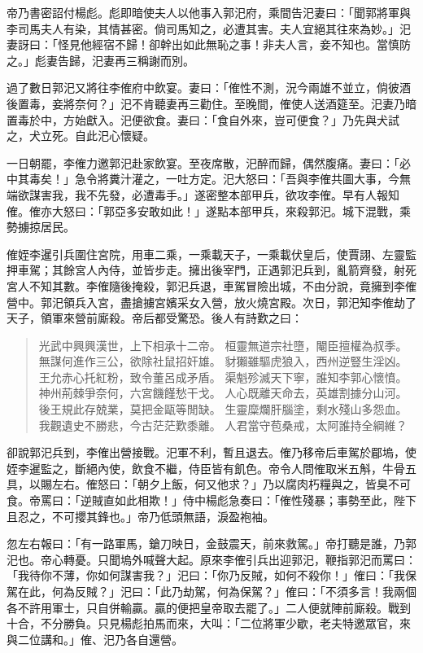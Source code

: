 帝乃書密詔付楊彪。彪即暗使夫人以他事入郭汜府，乘間告汜妻曰：「聞郭將軍與李司馬夫人有染，其情甚密。倘司馬知之，必遭其害。夫人宜絕其往來為妙。」汜妻訝曰：「怪見他經宿不歸！卻幹出如此無恥之事！非夫人言，妾不知也。當慎防之。」彪妻告歸，汜妻再三稱謝而別。

過了數日郭汜又將往李傕府中飲宴。妻曰：「傕性不測，況今兩雄不並立，倘彼酒後置毒，妾將奈何？」汜不肯聽妻再三勸住。至晚間，傕使人送酒筵至。汜妻乃暗置毒於中，方始獻入。汜便欲食。妻曰：「食自外來，豈可便食？」乃先與犬試之，犬立死。自此汜心懷疑。

一日朝罷，李傕力邀郭汜赴家飲宴。至夜席散，汜醉而歸，偶然腹痛。妻曰：「必中其毒矣！」急令將糞汁灌之，一吐方定。汜大怒曰：「吾與李傕共圖大事，今無端欲謀害我，我不先發，必遭毒手。」遂密整本部甲兵，欲攻李傕。早有人報知傕。傕亦大怒曰：「郭亞多安敢如此！」遂點本部甲兵，來殺郭汜。城下混戰，乘勢擄掠居民。

傕姪李暹引兵圍住宮院，用車二乘，一乘載天子，一乘載伏皇后，使賈詡、左靈監押車駕；其餘宮人內侍，並皆步走。擁出後宰門，正遇郭汜兵到，亂箭齊發，射死宮人不知其數。李傕隨後掩殺，郭汜兵退，車駕冒險出城，不由分說，竟擁到李傕營中。郭汜領兵入宮，盡搶擄宮嬪采女入營，放火燒宮殿。次日，郭汜知李傕劫了天子，領軍來營前廝殺。帝后都受驚恐。後人有詩歎之曰：

\begin{quote}
光武中興興漢世，上下相承十二帝。
桓靈無道宗社墮，閹臣擅權為叔季。
無謀何進作三公，欲除社鼠招奸雄。
豺獺雖驅虎狼入，西州逆豎生淫凶。
王允赤心托紅粉，致令董呂成矛盾。
渠魁殄滅天下寧，誰知李郭心懷憤。
神州荊棘爭奈何，六宮饑饉愁干戈。
人心既離天命去，英雄割據分山河。
後王規此存兢業，莫把金甌等閒缺。
生靈糜爛肝腦塗，剩水殘山多怨血。
我觀遺史不勝悲，今古茫茫歎黍離。
人君當守苞桑戒，太阿誰持全綱維？
\end{quote}

卻說郭汜兵到，李傕出營接戰。汜軍不利，暫且退去。傕乃移帝后車駕於郿塢，使姪李暹監之，斷絕內使，飲食不繼，侍臣皆有飢色。帝令人問傕取米五斛，牛骨五具，以賜左右。傕怒曰：「朝夕上飯，何又他求？」乃以腐肉朽糧與之，皆臭不可食。帝罵曰：「逆賊直如此相欺！」侍中楊彪急奏曰：「傕性殘暴；事勢至此，陛下且忍之，不可攖其鋒也。」帝乃低頭無語，淚盈袍袖。

忽左右報曰：「有一路軍馬，鎗刀映日，金鼓震天，前來救駕。」帝打聽是誰，乃郭汜也。帝心轉憂。只聞塢外喊聲大起。原來李傕引兵出迎郭汜，鞭指郭汜而罵曰：「我待你不薄，你如何謀害我？」汜曰：「你乃反賊，如何不殺你！」傕曰：「我保駕在此，何為反賊？」汜曰：「此乃劫駕，何為保駕？」傕曰：「不須多言！我兩個各不許用軍士，只自併輸贏。贏的便把皇帝取去罷了。」二人便就陣前廝殺。戰到十合，不分勝負。只見楊彪拍馬而來，大叫：「二位將軍少歇，老夫特邀眾官，來與二位講和。」傕、汜乃各自還營。

